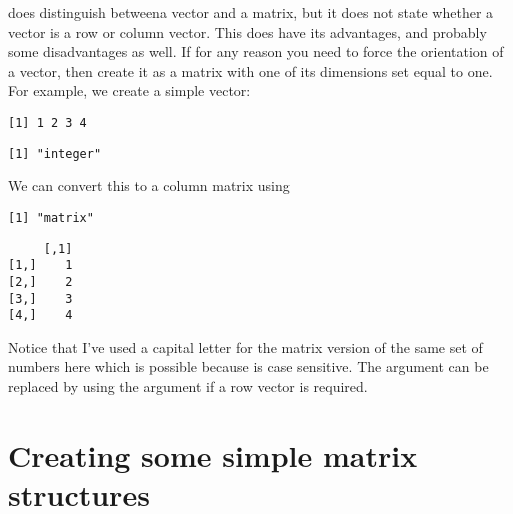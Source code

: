 \R{} does distinguish betweena vector and a matrix, but it does not state whether a vector is a row or column vector. This does have its advantages, and probably some disadvantages as well. If for any reason you need to force the orientation of a vector, then create it as a matrix with one of its dimensions set equal to one. For example, we create a simple vector: 
\begin{knitrout}
\color{fgcolor}\begin{kframe}
\begin{alltt}
\hlstd{> }\hlkwb{=}\hlopt{:}
\hlstd{> }
\end{alltt}
\begin{verbatim}
[1] 1 2 3 4
\end{verbatim}
\begin{alltt}
\hlstd{> }
\end{alltt}
\begin{verbatim}
[1] "integer"
\end{verbatim}
\end{kframe}
\end{knitrout}
We can convert this to a column matrix using 
\begin{knitrout}
\color{fgcolor}\begin{kframe}
\begin{alltt}
\hlstd{> }\hlkwb{=} \hlstd{=}\hlstd{)}
\hlstd{> }
\end{alltt}
\begin{verbatim}
[1] "matrix"
\end{verbatim}
\begin{alltt}
\hlstd{> }
\end{alltt}
\begin{verbatim}
     [,1]
[1,]    1
[2,]    2
[3,]    3
[4,]    4
\end{verbatim}
\end{kframe}
\end{knitrout}
Notice that I've used a capital letter for the matrix version of the same set of numbers here which is possible because \R{} is case sensitive. The  argument can be replaced by using the  argument if a row vector is required. 
 
\section{Creating some simple matrix structures} 
 

